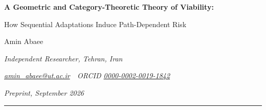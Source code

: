 \documentclass[11pt,a4paper]{article}
\theoremstyle{plain}
\theoremstyle{definition}
\theoremstyle{remark}
\begin{document}
\begin{center}
  \vspace*{0.4em}
  {\large\bfseries A Geometric and Category-Theoretic Theory of
   Viability:\par
   How Sequential Adaptations Induce Path-Dependent Risk\par}
  \vspace{0.8em}
  {\normalsize Amin Abaee\par}
  \vspace{0.3em}
  {\small\itshape Independent Researcher, Tehran, Iran\par}
  {\small\itshape \href{mailto:amin_abaee@ut.ac.ir}{amin\_abaee@ut.ac.ir}\ \textbullet\ ORCID \href{https://orcid.org/0000-0002-0019-1842}{0000-0002-0019-1842}\par}
  \vspace{0.2em}
  {\small\itshape Preprint, September 2026\par}
  \vspace{0.6em}
  \rule{0.7\textwidth}{0.4pt}
\end{center}
\end{document}
